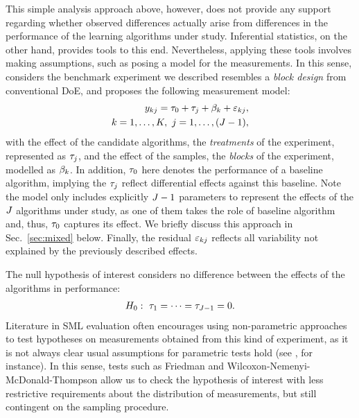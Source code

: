 This simple analysis approach above, however, does not provide any
support regarding whether observed differences actually arise from
differences in the performance of the learning algorithms under study.
%
Inferential statistics, on the other hand, provides tools to this end.
%
Nevertheless, applying these tools involves making assumptions,
such as posing a model for the measurements.
%
In this sense, \citet{EugsterPhD, Eugster2008ExpInf}
considers the benchmark experiment we described resembles a 
\emph{block design} from conventional DoE,
and proposes the following measurement model:
%
\begin{align}
  \begin{split}
    \PerfFun_{\SampIx\AlgIx} =
      \EffectTreat_0 +
        \EffectTreat_{\AlgIx} + 
        \EffectBlock_{\SampIx} +
        \Residual_{\SampIx\AlgIx},\\%
    \SampIx =  1, \dots , \SampNum,~\AlgIx = 1, \dots, (\AlgNum - 1),
    \label{eq:rbd}
  \end{split}
\end{align}
%
with the effect of the candidate algorithms,
the \emph{treatments} of the experiment, 
represented as $\tau_{j}$,
and the effect of the samples, the \emph{blocks} of the experiment,
modelled as $\beta_{k}$.
%
In addition, $\tau_0$ here denotes the performance of a 
baseline algorithm,
implying the $\tau_{j}$ reflect differential effects
against this baseline.
%
Note the model only includes explicitly $J-1$ parameters to 
represent the effects of the $J$ algorithms under study,
as one of them takes the role of baseline algorithm and, thus,
$\tau_{0}$ captures its effect.
%
We briefly discuss this approach in Sec.~\ref{sec:mixed} below.
%
Finally, the residual $\varepsilon_{kj}$ reflects all
variability not explained by the previously described effects.

The null hypothesis of interest considers no difference between
the effects of the algorithms in performance:
%
\begin{align}
  \begin{split}
    H_0 &{}:~\tau_1 = \cdots = \tau_{J - 1} = 0.\\
  \end{split}
\end{align}
%
Literature in SML evaluation often encourages using non-parametric approaches
to test hypotheses on measurements obtained from this kind of 
experiment, as it is not always clear usual assumptions 
for parametric tests hold (see \citet{JapkowiczELA}, for instance).
%
In this sense, tests such as Friedman and Wilcoxon-Nemenyi-McDonald-Thompson
allow us to check the hypothesis of interest with less restrictive
requirements about the distribution of measurements,
but still contingent on the sampling procedure.

